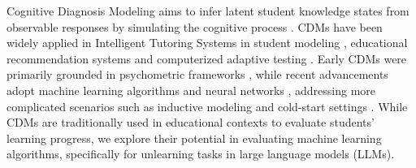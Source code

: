 Cognitive Diagnosis Modeling aims to infer latent student knowledge states from observable responses by simulating the cognitive process \citep{wang2024survey}. CDMs have been widely applied in Intelligent Tutoring Systems \citep{anderson2014engaging,burns2014intelligent} in student modeling \citep{roberts2010developing,maas2022cognitive}, educational recommendation systems \citep{liu2019exploiting,cheng2021exercise} and computerized adaptive testing \citep{zhuang2024bounded}. Early CDMs were primarily grounded in psychometric frameworks \citep{de2009dina,ackerman2014multidimensional}, while recent advancements adopt machine learning algorithms \citep{liu2018fuzzy} and neural networks \citep{wang2022neuralcd,jiao2023neural}, addressing more complicated scenarios such as inductive modeling \citep{liu2024inductive} and cold-start settings \citep{gao2024zero,gao2023leveraging}.
While CDMs are traditionally used in educational contexts to evaluate students' learning progress, we explore their potential in evaluating machine learning algorithms, specifically for unlearning tasks in large language models (LLMs). 
